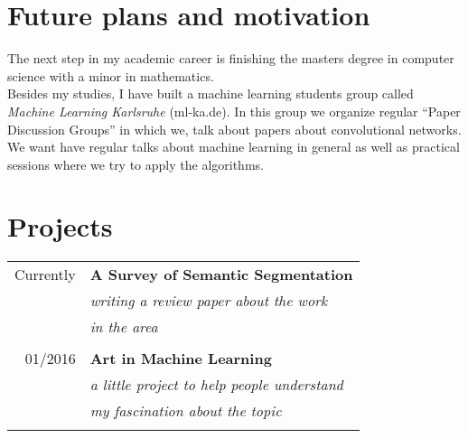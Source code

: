 \documentclass[a4paper,10pt]{article} %
\begin{document}
{\begin{minipage}[t]{0.5\textwidth}

\section{Future plans and motivation}

The next step in my academic career is finishing the masters degree in computer
science with a minor in mathematics.\\

Besides my studies, I have built a machine learning students group called
\textit{Machine Learning Karlsruhe} (ml-ka.de). In this group we organize
regular \enquote{Paper Discussion Groups} in which we, talk about papers
about convolutional networks. We want have regular talks about machine learning
in general as well as practical sessions where we try to apply the
algorithms.



\end{minipage} %
\hfill
\begin{minipage}[t]{0.44\textwidth}
\vspace{0pt} %


\section{Projects}

\begin{tabular}{rl}
Currently  & \textbf{A Survey of Semantic Segmentation}\\
& \textit{writing a review paper about the work }\\
& \textit{in the area}\\ \\

01/2016  & \textbf{Art in Machine Learning}\\
& \textit{a little project to help people understand}\\
& \textit{my fascination about the topic}\\ \\


\end{tabular}
\end{minipage}}
\end{document}
